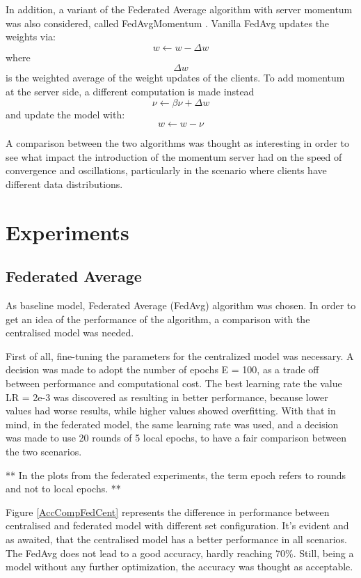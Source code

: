 \documentclass[twocolumn]{article}
\begin{document}
In addition, a variant of the Federated Average algorithm with server momentum was also considered, called FedAvgMomentum \cite{DBLP:journals/corr/abs-1909-06335}. Vanilla FedAvg updates the weights via: \[ w \leftarrow w - \Delta  w\] where \[\Delta  w  \] is the weighted average of the weight updates of the clients. To add momentum at the server side, a different computation is made instead \[ \nu \leftarrow  \beta\nu + \Delta w  \] and update the model with: \[w \leftarrow w - \nu \]

A comparison between the two algorithms was thought as interesting in order to see what impact the introduction of the momentum server had on the speed of convergence and oscillations, particularly in the scenario where clients have different data distributions.


\section{Experiments} %
\subsection{Federated Average}
As baseline model, Federated Average (FedAvg) algorithm was chosen. In order to get an idea of the performance of the algorithm, a comparison with the centralised model was needed. 

First of all, fine-tuning the parameters for the centralized model was necessary. A decision was made to adopt the number of epochs E = 100, as a trade off between performance and computational cost. The best learning rate the value LR = 2e-3 was discovered as resulting in better performance, because lower values had worse results, while higher values showed overfitting. With that in mind, in the federated model, the same learning rate was used, and a decision was made to use 20 rounds of 5 local epochs, to have a fair comparison between the two scenarios.

** In the plots from the federated experiments, the term epoch refers to rounds and not to local epochs. **

Figure \ref{AccCompFedCent} represents the difference in performance between centralised and federated model with different set configuration. It's evident and as awaited, that the centralised model has a better performance in all scenarios. The FedAvg does not lead to a good accuracy, hardly reaching 70\%. Still, being a model without any further optimization, the accuracy was thought as acceptable.
\end{document}
